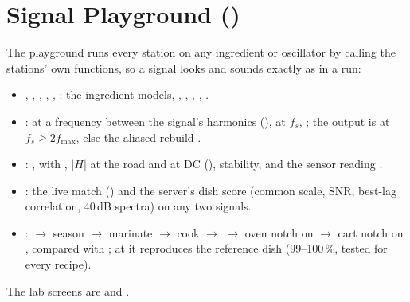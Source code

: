 \documentclass[11pt,a4paper]{article}
\begin{document}
\section{Signal Playground ()}
The playground runs every station on any ingredient or oscillator by calling the stations' own
functions, so a signal looks and sounds exactly as in a run:
\begin{itemize}
\item {}, , , ,
  , : the ingredient models, ,
  , , ,
  .
\item {}:  at a frequency between the signal's harmonics
  (),  at $f_s$,
  ; the output is  at $f_s\ge2f_{\max}$, else the
  aliased rebuild .
\item {}: ,  with ,
  $|H|$ at the road and at DC (), stability, and the sensor reading .
\item {}: the live match () and the server's dish score
  (common scale, SNR, best-lag correlation, 40\,dB spectra) on any two signals.
\item {}:  $\rightarrow$ season $\rightarrow$ marinate
  $\rightarrow$ cook $\rightarrow$  $\rightarrow$ oven notch on 
  $\rightarrow$ cart notch on , compared with ; at
   it reproduces the reference dish (99--100\,\%, tested for every recipe).
\end{itemize}
The lab screens are  and .

\end{document}
